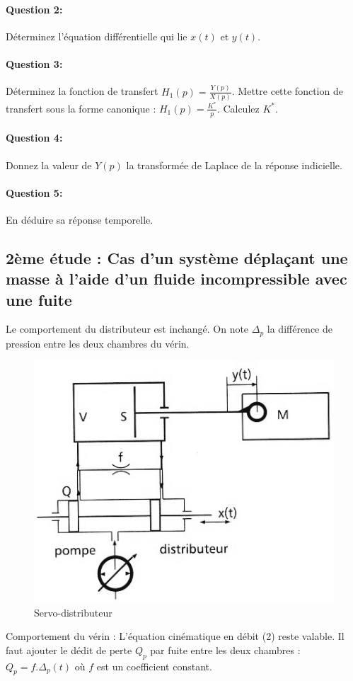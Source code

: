 \paragraph{Question 2:} Déterminez l'équation différentielle qui lie $x(t)$ et $y(t)$.

\paragraph{Question 3:} Déterminez la fonction de transfert $H_1(p)=\frac{Y(p)}{X(p)}$. Mettre cette fonction de transfert sous la forme canonique : $H_1(p)=\frac{K^*}{p}$. Calculez $K^*$.

\paragraph{Question 4:} Donnez la valeur de $Y(p)$ la transformée de Laplace de la réponse indicielle.

\paragraph{Question 5:} En déduire sa réponse temporelle. 

\subsection{2ème étude : Cas d'un système déplaçant une masse à l'aide d'un fluide incompressible avec une fuite}

Le comportement du distributeur est inchangé.
On note $\Delta_p$ la différence de pression entre les deux chambres du vérin.

\begin{figure}[!h]
 \centering\includegraphics[width=0.4\linewidth]{img/diravi5.png}
 \caption{Servo-distributeur}
 \label{diravi5}
\end{figure}

Comportement du vérin : L'équation cinématique en débit (2) reste valable. Il faut ajouter le dédit de perte $Q_p$ par fuite entre les deux chambres : $Q_p=f.\Delta_p(t)$ où $f$ est un coefficient constant.

